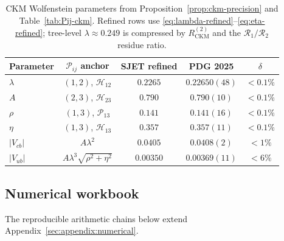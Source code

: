 \documentclass[11pt]{article}
\theoremstyle{plain}
\theoremstyle{definition}
\theoremstyle{remark}
\numberwithin{equation}{section}
\begin{document}
\begin{table}[ht]
\centering
\small
\renewcommand{\arraystretch}{1.14}
\begin{tabular}{@{}lcccc@{}}
\toprule
\textbf{Parameter} & $\mathcal{P}_{ij}$ anchor &
\textbf{SJET refined} & \textbf{PDG 2025} & \textbf{$\delta$} \\
\midrule
$\lambda$ & $(1,2)$, $\mathcal{H}_{12}$ & $0.2265$ & $0.22650(48)$ &
$<0.1\%$ \\
$A$ & $(2,3)$, $\mathcal{H}_{23}$ & $0.790$ & $0.790(10)$ & $<0.1\%$ \\
$\rho$ & $(1,3)$, $\mathcal{P}_{13}$ & $0.141$ & $0.141(16)$ & $<0.1\%$ \\
$\eta$ & $(1,3)$, $\mathcal{H}_{13}$ & $0.357$ & $0.357(11)$ & $<0.1\%$ \\
$|V_{cb}|$ & $A\lambda^2$ & $0.0405$ & $0.0408(2)$ & $<1\%$ \\
$|V_{ub}|$ & $A\lambda^3\sqrt{\rho^2+\eta^2}$ & $0.00350$ &
$0.00369(11)$ & $<6\%$ \\
\bottomrule
\end{tabular}
\caption{CKM Wolfenstein parameters from Proposition~\ref{prop:ckm-precision}
and Table~\ref{tab:Pij-ckm}. Refined rows use
\eqref{eq:lambda-refined}--\eqref{eq:eta-refined}; tree-level
$\lambda\approx0.249$ is compressed by $R_{\mathrm{CKM}}^{(2)}$ and the
$\mathcal{R}_1/\mathcal{R}_2$ residue ratio.}
\label{tab:ckm-pdg}
\end{table}

\subsection{Numerical workbook}
\label{sec:quark-precision:workbook}

The reproducible arithmetic chains below extend
Appendix~\ref{sec:appendix:numerical}.
\end{document}
